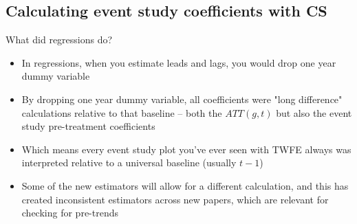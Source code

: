 \documentclass{beamer}
\begin{document}
\subsection{Calculating event study coefficients with CS}


\begin{frame}{What did regressions do?}

\begin{itemize}

\item In regressions, when you estimate leads and lags, you would drop one year dummy variable
\item By dropping one year dummy variable, all coefficients were "long difference" calculations relative to that baseline -- both the $ATT(g,t)$ but also the event study pre-treatment coefficients
\item Which means every event study plot you've ever seen with TWFE always was interpreted relative to a universal baseline (usually $t-1$)
\item Some of the new estimators will allow for a different calculation, and this has created inconsistent estimators across new papers, which are relevant for checking for pre-trends

\end{itemize}

\end{frame}
\end{document}
